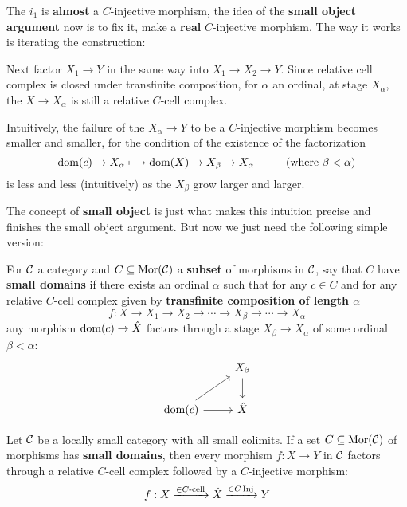 \begin{intro}
            \par The $i_1$ is \textbf{almost} a $C$-injective morphism,
            the idea of the \textbf{small object argument} now is to fix it,
            make a \textbf{real} $C$-injective morphism. 
            The way it works is iterating the construction:
            \par Next factor $X_1 \to Y$ in the same way into $X_1 \to X_2 \to Y$.
            Since relative cell complex is closed under transfinite composition,
            for $\alpha$ an ordinal, at stage $X_{\alpha}$, the $X \to X_{\alpha}$
            is still a relative $C$-cell complex.
            \par Intuitively,
            the failure of the $X_{\alpha} \to Y$ to be a $C$-injective morphism becomes smaller and smaller,
            for the condition of the existence of the factorization
            $$\operatorname{dom}(c) \to X_{\alpha} \longmapsto \operatorname{dom}(X) \to X_{\beta} \to X_{\alpha} \hspace*{1cm} \text{(where  $\beta < \alpha$)}$$
            is less and less (intuitively) as the $X_\beta$ grow larger and larger.
            \par The concept of \textbf{small object} is just what makes this intuition precise and finishes the small object argument.
            But now we just need the following simple version:
        \end{intro}
        \begin{defn}
            For $\mathcal{C}$ a category and $C \subseteq \operatorname{\rm{Mor}}(\mathcal{C})$ a \textbf{subset} of morphisms in $\mathcal{C}$,
            say that $C$ have \textbf{small domains} if there exists an ordinal $\alpha$
            such that for any $c \in C$ and for any relative $C$-cell complex given by \textbf{transfinite composition of length $\alpha$}
            $$f : X \to X_1 \to X_2 \to \cdots \to X_{\beta} \to \cdots \to X_\alpha$$
            any morphism $\operatorname{dom}(c) \to \hat{X}$ factors through a stage $X_{\beta} \to X_{\alpha}$ of some ordinal $\beta < \alpha$:
            \[\begin{tikzcd}
                & {X_{\beta}} \\
                {\dom(c)} & {\hat{X}}
                \arrow[from=2-1, to=2-2]
                \arrow[from=1-2, to=2-2]
                \arrow[from=2-1, to=1-2]
            \end{tikzcd}\]

        \end{defn}

        \begin{prop}
            Let $\mathcal{C}$ be a locally small category with all small colimits.
            If a set $ C \subseteq  \operatorname{\rm{Mor}}(\mathcal{C})$ of morphisms has \textbf{small domains},
            then every morphism $f : X \rightarrow Y$ in $\mathcal{C}$ factors through a relative $C$-cell complex followed by a $C$-injective morphism:
            $$ f : X \xrightarrow{\in C \text{-cell}}  \hat{X} \xrightarrow{\in C \operatorname{\rm{Inj}}} Y $$
        \end{prop}

